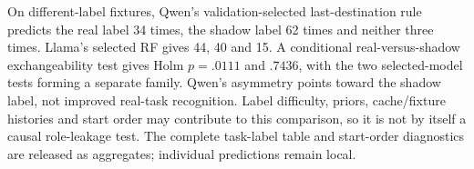 On different-label fixtures, Qwen's validation-selected last-destination rule predicts the real label 34 times, the shadow label 62 times and neither three times. Llama's selected RF gives 44, 40 and 15. A conditional real-versus-shadow exchangeability test gives Holm $p=.0111$ and $.7436$, with the two selected-model tests forming a separate family. Qwen's asymmetry points toward the shadow label, not improved real-task recognition. Label difficulty, priors, cache/fixture histories and start order may contribute to this comparison, so it is not by itself a causal role-leakage test. The complete task-label table and start-order diagnostics are released as aggregates; individual predictions remain local.

